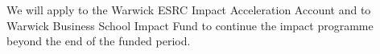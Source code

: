 \documentclass[11pt, a4paper]{article}
\begin{document}
We will apply to the Warwick ESRC Impact Acceleration Account and to Warwick Business School Impact Fund to continue the impact programme beyond the end of the funded period. 

%
%
%
%
%
\end{document}
